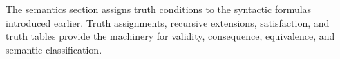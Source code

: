\begin{remark*}[Exposition]
The semantics section assigns truth conditions to the syntactic formulas
introduced earlier. Truth assignments, recursive extensions, satisfaction,
and truth tables provide the machinery for validity, consequence, equivalence,
and semantic classification.
\end{remark*}

